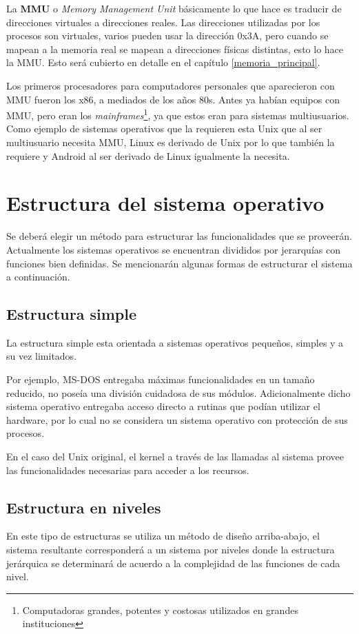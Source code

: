 La \textbf{MMU} o \textit{Memory Management Unit} básicamente lo que hace es
traducir de direcciones virtuales a direcciones reales. Las direcciones
utilizadas por los procesos son virtuales, varios pueden usar la dirección 0x3A,
pero cuando se mapean a la memoria real se mapean a direcciones físicas
distintas, esto lo hace la MMU. Esto será cubierto en detalle en el capítulo
\ref{memoria_principal}.

Los primeros procesadores para computadores personales que aparecieron con MMU
fueron los x86, a mediados de los años 80s. Antes ya habían equipos con MMU,
pero eran los \textit{mainframes}\footnote{Computadoras grandes, potentes y
costosas utilizados en grandes instituciones}, ya que estos eran para
sistemas multiusuarios. Como ejemplo de sistemas operativos que la requieren
esta Unix que al ser multiusuario necesita MMU, Linux es derivado de Unix por lo
que también la requiere y Android al ser derivado de Linux igualmente la
necesita.

\section{Estructura del sistema operativo}
Se deberá elegir un método para estructurar las funcionalidades que se
proveerán. Actualmente los sistemas operativos se encuentran divididos por
jerarquías con funciones bien definidas. Se mencionarán algunas formas de
estructurar el sistema a continuación.

\subsection{Estructura simple}
La estructura simple esta orientada a sistemas operativos pequeños, simples y a
su vez limitados.

Por ejemplo, MS-DOS entregaba máximas funcionalidades en un tamaño reducido, no
poseía una división cuidadosa de sus módulos. Adicionalmente dicho sistema
operativo entregaba acceso directo a rutinas que podían utilizar el hardware,
por lo cual no se considera un sistema operativo con protección de sus procesos.

En el caso del Unix original, el kernel a través de las llamadas al sistema
provee las funcionalidades necesarias para acceder a los recursos.

\subsection{Estructura en niveles}
En este tipo de estructuras se utiliza un método de diseño arriba-abajo, el
sistema resultante corresponderá a un sistema por niveles donde la estructura
jerárquica se determinará de acuerdo a la complejidad de las funciones de cada
nivel.

